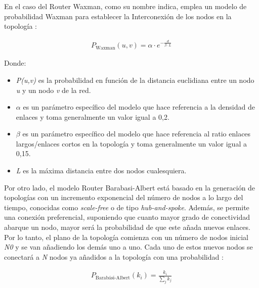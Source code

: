 \vspace{3mm}

En el caso del Router Waxman, como su nombre indica, emplea un modelo de probabilidad Waxman para establecer la Interconexión de los nodos en la topología \cite{brite_zegura}:

\begin{equation}
    \begin{aligned}
        P_{\text{Waxman}}(u,v) = \alpha \cdot e^{-\frac{d}{\beta \cdot L}}
    \end{aligned}
\end{equation} 

\pagebreak

    Donde:
\begin{itemize}
    \renewcommand{\labelitemi}{}
    \item \textit{P(u,v)} es la probabilidad en función de la distancia euclidiana entre un nodo \textit{u} y un nodo \textit{v} de la red.
    \item $\alpha$ es un parámetro específico del modelo que hace referencia a la densidad de enlaces y toma generalmente un valor igual a 0,2.
    \item $\beta$ es un parámetro específico del modelo que hace referencia al ratio enlaces largos/enlaces cortos en la topología y toma generalmente un valor igual a 0,15.
    \item \textit{L} es la máxima distancia entre dos nodos cualesquiera.
\end{itemize}

\vspace{3mm}

Por otro lado, el modelo Router Barabasi-Albert está basado en la generación de topologías con un incremento exponencial del número de nodos a lo largo del tiempo, conocidas como \textit{scale-free} o de tipo \textit{hub-and-spoke}. Además, se permite una conexión preferencial, suponiendo que cuanto mayor grado de conectividad abarque un nodo, mayor será la probabilidad de que este añada nuevos enlaces. Por lo tanto, el plano de la topología comienza con un número de nodos inicial \textit{N0} y se van añadiendo los demás uno a uno. Cada uno de estos nuevos nodos se conectará a \textit{N} nodos ya añadidos a la topología con una probabilidad \cite{brite_zegura}:

\begin{equation}
    \begin{aligned}
        P_{\text{Barabási-Albert}}(k_i) = \frac{k_i}{\sum_{j}^{}k_j}
    \end{aligned}
\end{equation} 
    
